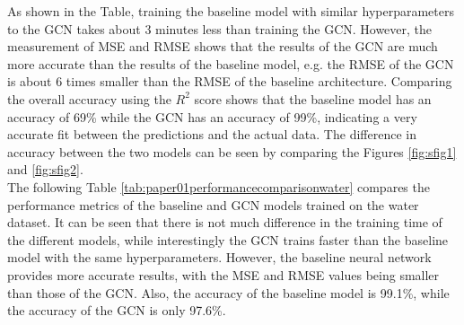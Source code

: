 As shown in the Table, training the baseline model with similar hyperparameters to the GCN takes about 3 minutes less than training the GCN. However, the measurement of MSE and RMSE shows that the results of the GCN are much more accurate than the results of the baseline model, e.g. the RMSE of the GCN is about 6 times smaller than the RMSE of the baseline architecture. Comparing the overall accuracy using the $R^2$ score shows that the baseline model has an accuracy of 69\% while the GCN has an accuracy of 99\%, indicating a very accurate fit between the predictions and the actual data. The difference in accuracy between the two models can be seen by comparing the Figures \ref{fig:sfig1} and \ref{fig:sfig2}.\\
The following Table \ref{tab:paper01performancecomparisonwater} compares the performance metrics of the baseline and GCN models trained on the water dataset. It can be seen that there is not much difference in the training time of the different models, while interestingly the GCN trains faster than the baseline model with the same hyperparameters. However, the baseline neural network provides more accurate results, with the MSE and RMSE values being smaller than those of the GCN. Also, the accuracy of the baseline model is 99.1\%, while the accuracy of the GCN is only 97.6\%. 

\begin{table}[h!]
    \centering
    \captionsetup{justification=centering}
       \caption[Comparison of performance metrics of the developed model (water dataset)]{\label{tab:paper01performancecomparisonwater} Comparison of performance metrics of the developed model [water dataset]}
\end{table}


